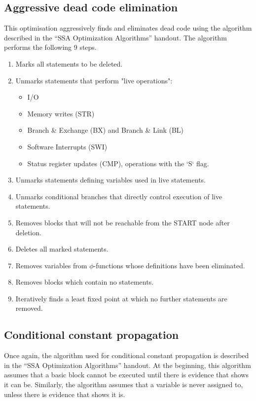 \documentclass[a4paper,10pt]{report}
\begin{document}
\subsection{Aggressive dead code elimination}
This optimisation aggressively finds and eliminates dead code using the algorithm described in the ``SSA Optimization 
Algorithms'' handout. The algorithm performs the following 9 steps.
\begin{enumerate}
\item Marks all statements to be deleted.
\item Unmarks statements that perform "live operations":
  \begin{itemize}
  \item I/O
  \item Memory writes (STR)
  \item Branch \& Exchange (BX) and Branch \& Link (BL)
  \item Software Interrupts (SWI)
  \item Status register updates (CMP), operations with the `S` flag.
  \end{itemize}
\item Unmarks statements defining variables used in live statements.
\item Unmarks conditional branches that directly control execution of live statements.
\item Removes blocks that will not be reachable from the START node after deletion.
\item Deletes all marked statements.
\item Removes variables from  \(\phi\)-functions whose definitions have been eliminated.
\item Removes blocks which contain no statements.
\item Iteratively finds a least fixed point at which no further statements are removed.
\end{enumerate}

\subsection{Conditional constant propagation}
Once again, the algorithm used for conditional constant propagation is described in the ``SSA Optimization Algorithms'' handout.
At the beginning, this algorithm assumes that a basic block cannot be executed until there is evidence that shows it can be.
Similarly, the algorithm assumes that a variable is never assigned to, unless there is evidence that shows it is.
\end{document}
